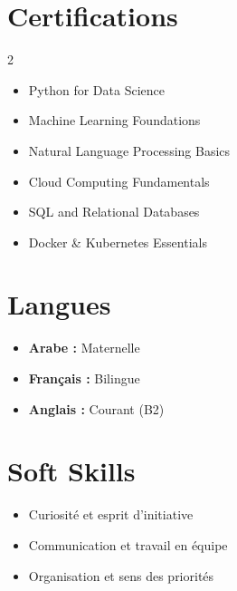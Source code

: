 \documentclass[11pt,a4paper]{extarticle}
\let\oldtextbf\textbf
\renewcommand{\textbf}[1]{\textcolor{primary}{\oldtextbf{#1}}}
\begin{document}
\section*{Certifications}
\setlength{\multicolsep}{0pt}
\begin{multicols}{2}
\begin{itemize}
    \item Python for Data Science
    \item Machine Learning Foundations
    \item Natural Language Processing Basics
    \item Cloud Computing Fundamentals
    \item SQL and Relational Databases
    \item Docker \& Kubernetes Essentials
\end{itemize}
\end{multicols}

\vspace{1pt}

\begin{minipage}[t]{0.48\textwidth}
    \section*{Langues}
    \begin{itemize}
        \item \textbf{Arabe :} Maternelle
        \item \textbf{Français :} Bilingue
        \item \textbf{Anglais :} Courant (B2)
    \end{itemize}
\end{minipage}
\hfill
\begin{minipage}[t]{0.48\textwidth}
    \section*{Soft Skills}
    \begin{itemize}
        \item Curiosité et esprit d'initiative
        \item Communication et travail en équipe
        \item Organisation et sens des priorités
    \end{itemize}
\end{minipage}
\end{document}
